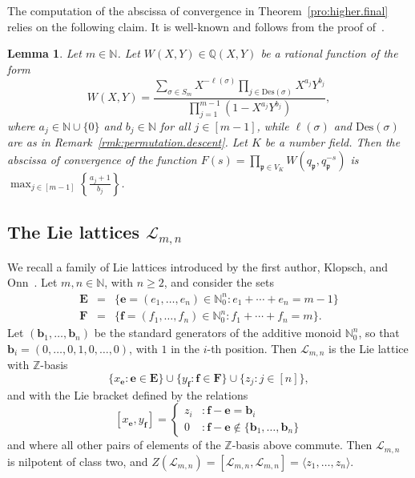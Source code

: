 \documentclass[11pt,a4paper]{amsart}
\theoremstyle{plain}
\newtheorem{lem}[thm]{Lemma}
\theoremstyle{remark}
\newcommand{\N}{\mathbb{N}}
\newcommand{\Z}{\mathbb{Z}}
\newcommand{\Q}{\mathbb{Q}}
\newcommand{\p}{\mathfrak{p}}
\def \p {\ensuremath{\mathfrak{p}}}
\begin{document}
The computation of the abscissa of convergence in Theorem~\ref{pro:higher.final} relies on the following claim.  It is well-known and follows from the proof of~\cite[Corollary~3.1]{Voll/19}.
\begin{lem} \label{lem:abscissa}
Let $m \in \N$.  Let $W(X,Y) \in \Q(X,Y)$ be a rational function of the form
$$ W(X,Y) = \frac{\sum_{\sigma \in S_m} X^{- \ell(\sigma)} \prod_{j \in \mathrm{Des}(\sigma)} X^{a_j}Y^{b_j}}{\prod_{j = 1}^{m-1} (1 - X^{a_j} Y^{b_j})},$$
where $a_j \in \N \cup \{ 0 \}$ and $b_j \in \N$ for all $j \in [m-1]$, while $\ell(\sigma)$ and $\mathrm{Des}(\sigma)$ are as in Remark~\ref{rmk:permutation.descent}.  Let $K$ be a number field. Then the abscissa of convergence of the function
$ F(s) = \prod_{\p \in V_K} W(q_{\p}, q_{\p}^{-s})$
is $\max_{j \in [m-1]} \left\{ \frac{a_j + 1}{b_j} \right\}$.
\end{lem}

\subsection{The Lie lattices $\mathcal{L}_{m,n}$} \label{sec:lmn}
We recall a family of Lie lattices introduced by the first author, Klopsch, and Onn~\cite[Definition~2.1]{BKO/Dstar}.  Let $m,n \in \N$, with $n \geq 2$, and consider the sets
\begin{eqnarray*}
\mathbf{E} & = & \{ \mathbf{e} = (e_1, \dots, e_n) \in \N_0^n : e_1 + \cdots + e_n = m - 1 \} \\
\mathbf{F} & = & \{ \mathbf{f} = (f_1, \dots, f_n) \in \N_0^n : f_1 + \cdots + f_n = m \}.
\end{eqnarray*}
Let $(\mathbf{b}_1, \dots, \mathbf{b}_n)$ be the standard generators of the additive monoid $\N_0^n$, so that $\mathbf{b}_i = (0, \dots, 0, 1, 0, \dots, 0)$, with $1$ in the $i$-th position. 
Then $\mathcal{L}_{m,n}$ is the Lie lattice with $\Z$-basis 
$$ \{ x_{\mathbf{e}} : \mathbf{e} \in \mathbf{E} \} \cup \{ y_{\mathbf{f}} : \mathbf{f} \in \mathbf{F} \} \cup \{ z_j : j \in [n] \},$$
and with the Lie bracket defined by the relations
$$ [x_{\mathbf{e}}, y_{\mathbf{f}}] = \begin{cases}
z_i &: \mathbf{f} - \mathbf{e} = \mathbf{b}_i \\
0 &: \mathbf{f} - \mathbf{e} \not\in \{ \mathbf{b}_1, \dots, \mathbf{b}_n \}
\end{cases}
$$
and where all other pairs of elements of the $\Z$-basis above commute.  Then $\mathcal{L}_{m,n}$ is nilpotent of class two, and $Z(\mathcal{L}_{m,n}) = [\mathcal{L}_{m,n}, \mathcal{L}_{m,n}] = \langle z_1, \dots, z_n \rangle$.  
\end{document}
